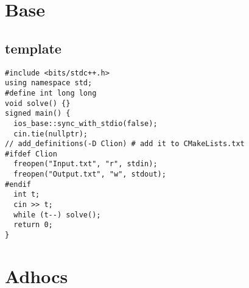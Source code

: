 \documentclass[twoside]{article}
\begin{document}

\begin{multicols*}{2}
    \tableofcontents
\end{multicols*}

\clearpage
\clearpage


\begin{multicols*}{2}
{
\section*{Base}
}
{
\subsection*{template}
}
\begin{verbatim}
#include <bits/stdc++.h>
using namespace std;
#define int long long
void solve() {}
signed main() {
  ios_base::sync_with_stdio(false);
  cin.tie(nullptr);
// add_definitions(-D Clion) # add it to CMakeLists.txt
#ifdef Clion
  freopen("Input.txt", "r", stdin);
  freopen("Output.txt", "w", stdout);
#endif
  int t;
  cin >> t;
  while (t--) solve();
  return 0;
}
\end{verbatim}

{
\section*{Adhocs}
}
{
}
\end{multicols*}
\end{document}
